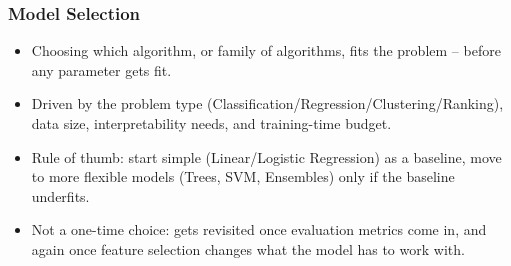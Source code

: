 \begin{frame}[fragile]\frametitle{Model Selection}
\begin{itemize}
\item Choosing which algorithm, or family of algorithms, fits the problem -- before any parameter gets fit.
\item Driven by the problem type (Classification/Regression/Clustering/Ranking), data size, interpretability needs, and training-time budget.
\item Rule of thumb: start simple (Linear/Logistic Regression) as a baseline, move to more flexible models (Trees, SVM, Ensembles) only if the baseline underfits.
\item Not a one-time choice: gets revisited once evaluation metrics come in, and again once feature selection changes what the model has to work with.
\end{itemize}
\end{frame}



